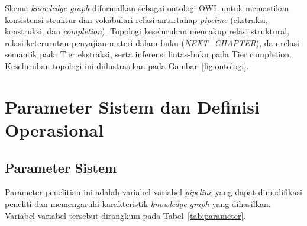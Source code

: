 \documentclass[main]{subfiles}
\begin{document}
Skema \textit{knowledge graph} diformalkan sebagai ontologi OWL untuk
memastikan konsistensi struktur dan vokabulari relasi antartahap
\textit{pipeline} (ekstraksi, konstruksi, dan \textit{completion}).
Topologi keseluruhan mencakup relasi struktural, relasi keterurutan
penyajian materi dalam buku (\textit{NEXT\_CHAPTER}), dan relasi semantik
pada Tier ekstraksi, serta inferensi lintas-buku pada Tier completion.
Keseluruhan topologi ini diilustrasikan pada Gambar~\ref{fig:ontologi}.



\section{Parameter Sistem dan Definisi Operasional}

\subsection{Parameter Sistem}
\label{subsec:parameter-sistem}

Parameter penelitian ini adalah variabel-variabel \textit{pipeline} yang
dapat dimodifikasi peneliti dan memengaruhi karakteristik \textit{knowledge
graph} yang dihasilkan. Variabel-variabel tersebut dirangkum pada
Tabel~\ref{tab:parameter}.
\end{document}
